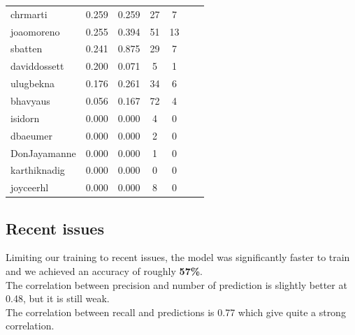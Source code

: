\documentclass[tikz,10pt,fleqn]{article}
\begin{document}
\begin{table}[H]
\begin{tabular}{@{}lcccccc@{}}
        chrmarti       & 0.259  & 0.259  & 27  & 7   \\
        joaomoreno     & 0.255  & 0.394  & 51  & 13  \\
        sbatten        & 0.241  & 0.875  & 29  & 7   \\
        daviddossett   & 0.200  & 0.071  & 5   & 1   \\
        ulugbekna      & 0.176  & 0.261  & 34  & 6   \\
        bhavyaus       & 0.056  & 0.167  & 72  & 4   \\
        isidorn        & 0.000  & 0.000  & 4   & 0   \\
        dbaeumer       & 0.000  & 0.000  & 2   & 0   \\
        DonJayamanne   & 0.000  & 0.000  & 1   & 0   \\
        karthiknadig   & 0.000  & 0.000  & 0   & 0   \\
        joyceerhl      & 0.000  & 0.000  & 8   & 0   \\ \bottomrule
    \end{tabular}
\end{table}

\subsection*{Recent issues}
Limiting our training to recent issues, the model was significantly faster to train and we achieved an accuracy of roughly \textbf{ 57\%}.\\
The correlation between precision and number of prediction is slightly better at 0.48, but it is still weak.\\
The correlation between recall and predictions is 0.77 which give quite a strong correlation.
\end{document}
